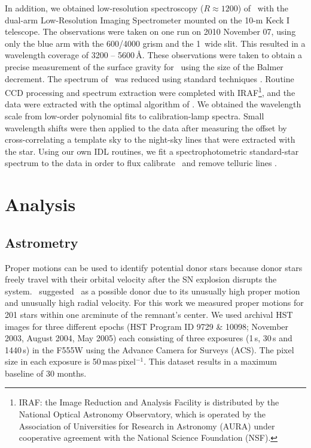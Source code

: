 In addition, we obtained low-resolution spectroscopy ($R\approx1200$) of
\starb\ with the dual-arm Low-Resolution Imaging Spectrometer \citep[LRIS;][]{Oke95} mounted on the 10-m Keck I telescope. The
observations were taken on one run on 2010 November 07, using only the blue
arm with the 600/4000 grism and the 1\arcsec\ wide slit. This resulted
in a wavelength coverage of 3200 -- 5600\,\AA. These observations
were taken to obtain a precise  measurement of the surface gravity for \starb\ using the size of the Balmer decrement.
The spectrum of \starb\ was reduced using standard techniques \citep[e.g.][]{Foley03}. Routine CCD processing and spectrum extraction
were completed with IRAF\footnote{IRAF: the Image Reduction and
Analysis Facility is distributed by the National Optical Astronomy
Observatory, which is operated by the Association of Universities for
Research in Astronomy (AURA) under cooperative agreement with the
National Science Foundation (NSF).}, and the data were extracted with
the optimal algorithm of \citet{Horne86}. We obtained the wavelength
scale from low-order polynomial fits to calibration-lamp spectra.
Small wavelength shifts were then applied to the data after measuring the offset by
cross-correlating a template sky to the night-sky lines that were
extracted with the star. Using our own IDL routines, we fit a
spectrophotometric standard-star spectrum to the data in order to flux
calibrate \starb\ and remove telluric lines \citep{Horne86,Matheson00}.


\section{Analysis}
\label{sec:analysis}

\subsection{Astrometry}
\label{sec:propmot}
Proper motions can be used to identify potential donor stars because donor stars freely travel with their orbital velocity after the SN explosion disrupts the system. \rl\ suggested \starg\ as a possible donor due to its unusually high proper motion and unusually high radial velocity. For this work we measured proper motions for 201 stars within one arcminute of the remnant's center. We used archival HST images for three different epochs (HST Program ID  9729 \& 10098; November 2003, August 2004, May 2005) each consisting of three exposures (1\,s, 30\,s and 1440\,s) in the F555W using the Advance Camera for Surveys (ACS). The pixel size in each exposure is 50\,mas\,pixel$^{-1}$. This dataset results in a maximum baseline of 30 months. 


